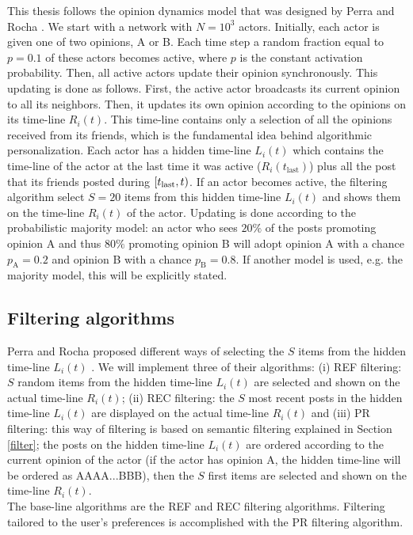 \documentclass[11 pt , letterpaper , twoside , openright]{book}
\begin{document}
This thesis follows the opinion dynamics model that was designed by Perra and Rocha \cite{Perra2019}. We start with a network with $N = 10^3$ actors.  Initially, each actor is given one of two opinions, A or B. Each time step a random fraction equal to $p= 0.1$ of these actors becomes active, where $p$ is the constant activation probability. Then, all active actors update their opinion synchronously. This updating is done as follows. First, the active actor broadcasts its current opinion to all its neighbors. Then, it updates its own opinion according to the opinions on its time-line $R_i(t)$. This time-line contains only a selection of all the opinions received from its friends, which is the fundamental idea behind algorithmic personalization. Each actor has a hidden time-line $L_i(t)$ which contains the time-line of the actor at the last time it was active ($R_i(t_{\text{last}})$) plus all the post that its friends posted during $\interval[right open fence =), open right]{t_\text{last}}{t}$. If an actor becomes active, the filtering algorithm select $S = 20$ items from this hidden time-line $L_i(t)$ and shows them on the time-line $R_i(t)$ of the actor. Updating is done according to the probabilistic majority model: an actor who sees $20\%$ of the posts promoting opinion A and thus $80\%$ promoting opinion B will adopt opinion A with a chance $p_\text{A} = 0.2$ and opinion B with a chance $p_\text{B} = 0.8$. If another model is used, e.g. the majority model, this will be explicitly stated.

\subsection{Filtering algorithms}

Perra and Rocha proposed different ways of selecting the $S$ items from the hidden time-line $L_i(t)$ \cite{Perra2019}. We will implement three of their algorithms: (i) REF filtering: $S$ random items from the hidden time-line $L_i(t)$ are selected and shown on the actual time-line $R_i(t)$; (ii) REC filtering: the $S$ most recent posts in the hidden time-line $L_i(t)$ are displayed on the actual time-line $R_i(t)$ and (iii) PR filtering: this way of filtering is based on semantic filtering explained in Section \ref{filter}; the posts on the hidden time-line $L_i(t)$ are ordered according to the current opinion of the actor (if the actor has opinion A, the hidden time-line will be ordered as AAAA...BBB), then the $S$ first items are selected and shown on the time-line $R_i(t)$.\\
\newline
The base-line algorithms are the REF and REC filtering algorithms. Filtering tailored to the user's preferences is accomplished with the PR filtering algorithm.
 
\end{document}
